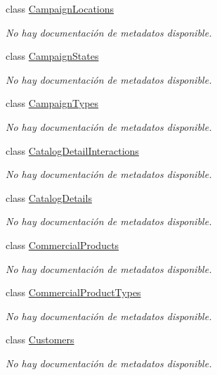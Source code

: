 \begin{DoxyCompactItemize}
class \hyperlink{class_game_memory_1_1_campaign_locations}{Campaign\-Locations}
\begin{DoxyCompactList}\small\item\em No hay documentación de metadatos disponible. \end{DoxyCompactList}\item 
class \hyperlink{class_game_memory_1_1_campaign_states}{Campaign\-States}
\begin{DoxyCompactList}\small\item\em No hay documentación de metadatos disponible. \end{DoxyCompactList}\item 
class \hyperlink{class_game_memory_1_1_campaign_types}{Campaign\-Types}
\begin{DoxyCompactList}\small\item\em No hay documentación de metadatos disponible. \end{DoxyCompactList}\item 
class \hyperlink{class_game_memory_1_1_catalog_detail_interactions}{Catalog\-Detail\-Interactions}
\begin{DoxyCompactList}\small\item\em No hay documentación de metadatos disponible. \end{DoxyCompactList}\item 
class \hyperlink{class_game_memory_1_1_catalog_details}{Catalog\-Details}
\begin{DoxyCompactList}\small\item\em No hay documentación de metadatos disponible. \end{DoxyCompactList}\item 
class \hyperlink{class_game_memory_1_1_commercial_products}{Commercial\-Products}
\begin{DoxyCompactList}\small\item\em No hay documentación de metadatos disponible. \end{DoxyCompactList}\item 
class \hyperlink{class_game_memory_1_1_commercial_product_types}{Commercial\-Product\-Types}
\begin{DoxyCompactList}\small\item\em No hay documentación de metadatos disponible. \end{DoxyCompactList}\item 
class \hyperlink{class_game_memory_1_1_customers}{Customers}
\begin{DoxyCompactList}\small\item\em No hay documentación de metadatos disponible. \end{DoxyCompactList}\item 

\end{DoxyCompactItemize}
